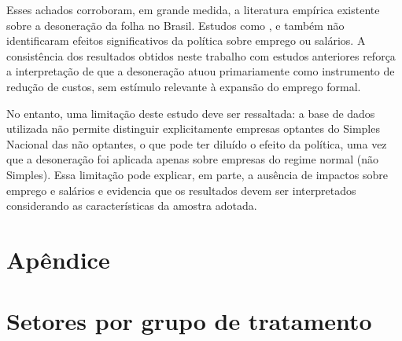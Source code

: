 \documentclass[12pt,a4paper,oneside]{article}
\begin{document}
		Esses achados corroboram, em grande medida, a literatura empírica existente sobre a desoneração da folha no Brasil. Estudos como \citet{docarmo2012}, \citet{Dallava2014} e \citet{Garcia2018} também não identificaram efeitos significativos da política sobre emprego ou salários. A consistência dos resultados obtidos neste trabalho com estudos anteriores reforça a interpretação de que a desoneração atuou primariamente como instrumento de redução de custos, sem estímulo relevante à expansão do emprego formal.
		
		No entanto, uma limitação deste estudo deve ser ressaltada: a base de dados utilizada não permite distinguir explicitamente empresas optantes do Simples Nacional das não optantes, o que pode ter diluído o efeito da política, uma vez que a desoneração foi aplicada apenas sobre empresas do regime normal (não Simples). Essa limitação pode explicar, em parte, a ausência de impactos sobre emprego e salários e evidencia que os resultados devem ser interpretados considerando as características da amostra adotada. 
		
		
				
		
		
		
		\cleardoublepage
		
		\section*{Apêndice}
		\appendix
		
		\section{Setores por grupo de tratamento}
		
\end{document}
